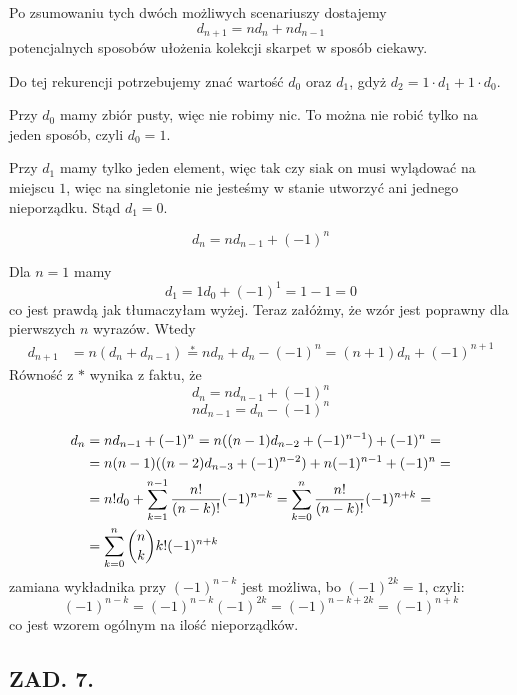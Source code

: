\documentclass{article}[13pt]
\begin{document}
Po zsumowaniu tych dwóch możliwych scenariuszy dostajemy
$$d_{n+1}=nd_n+nd_{n-1}$$
potencjalnych sposobów ułożenia kolekcji skarpet w sposób ciekawy.
\bigskip

Do tej rekurencji potrzebujemy znać wartość $d_0$ oraz $d_1$, gdyż $d_2=1\cdot d_1+1\cdot d_0$. 

Przy $d_0$ mamy zbiór pusty, więc nie robimy nic. To można nie robić tylko na jeden sposób, czyli $d_0=1$. 

Przy $d_1$ mamy tylko jeden element, więc tak czy siak on musi wylądować na miejscu $1$, więc na singletonie nie jesteśmy w stanie utworzyć ani jednego nieporządku. Stąd $d_1=0$.
\smallskip

$$d_n=nd_{n-1}+(-1)^n$$

Dla $n=1$ mamy 
$$d_1=1d_0+(-1)^1=1-1=0$$
co jest prawdą jak tłumaczyłam wyżej. Teraz załóżmy, że wzór jest poprawny dla pierwszych $n$ wyrazów. Wtedy
\begin{align*}
    d_{n+1}&=n(d_n+d_{n-1})\overset{*}{=}nd_n+d_n-(-1)^n=(n+1)d_n+(-1)^{n+1}
\end{align*}
Równość z $*$ wynika z faktu, że
$$d_n=nd_{n-1}+(-1)^n$$
$$nd_{n-1}=d_n-(-1)^n$$

\begin{align*}
    d_n&=nd_{n-1}+(-1)^n=n((n-1)d_{n-2}+(-1)^{n-1})+(-1)^n=\\
    &=n(n-1)((n-2)d_{n-3}+(-1)^{n-2})+n(-1)^{n-1}+(-1)^n=\\
    &=n!d_0+\sum\limits_{k=1}^{n-1}{n!\over (n-k)!}(-1)^{n-k}=\sum\limits_{k=0}^{n}{n!\over(n-k)!}(-1)^{n+k}=\\
    &=\sum\limits_{k=0}^n{n\choose k}k!(-1)^{n+k}
\end{align*}
zamiana wykładnika przy $(-1)^{n-k}$ jest możliwa, bo $(-1)^{2k}=1$, czyli:
$$(-1)^{n-k}=(-1)^{n-k}(-1)^{2k}=(-1)^{n-k+2k}=(-1)^{n+k}$$
co jest wzorem ogólnym na ilość nieporządków.

\subsection*{ZAD. 7.}
\end{document}
